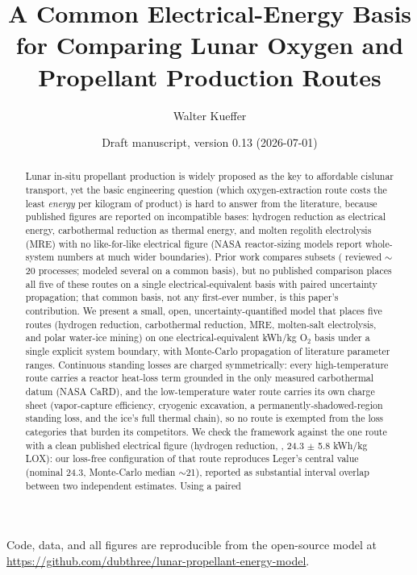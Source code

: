 \documentclass[11pt,a4paper]{article}
\title{A Common Electrical-Energy Basis for Comparing Lunar Oxygen and Propellant Production Routes}
\author{Walter Kueffer}
\date{Draft manuscript, version 0.13 (2026-07-01)}
\begin{document}
\maketitle

\begin{center}
Code, data, and all figures are reproducible from the open-source model at\\
\url{https://github.com/dubthree/lunar-propellant-energy-model}.
\end{center}

\begin{abstract}
Lunar in-situ propellant production is widely proposed as the key to affordable cislunar
transport, yet the basic engineering question (which oxygen-extraction route costs the
least \emph{energy} per kilogram of product) is hard to answer from the literature,
because published figures are reported on incompatible bases: hydrogen reduction as
electrical energy, carbothermal reduction as thermal energy, and molten regolith
electrolysis (MRE) with no like-for-like electrical figure (NASA reactor-sizing models
report whole-system numbers at much wider boundaries). Prior work compares subsets
(\citet{taylor1993} reviewed $\sim$20 processes; \citet{leger2025} modeled several on a
common basis), but no published comparison places all five of these routes on a single
electrical-equivalent basis with paired uncertainty propagation; that common basis, not
any first-ever number, is this paper's contribution. We present a small, open,
uncertainty-quantified model that places five routes (hydrogen reduction, carbothermal
reduction, MRE, molten-salt electrolysis, and polar water-ice mining) on one
electrical-equivalent kWh/kg O$_2$ basis under a single explicit system boundary, with
Monte-Carlo propagation of literature parameter ranges. Continuous standing losses are
charged symmetrically: every high-temperature route carries a reactor heat-loss term
grounded in the only measured carbothermal datum (NASA CaRD), and the low-temperature
water route carries its own charge sheet (vapor-capture efficiency, cryogenic excavation,
a permanently-shadowed-region standing loss, and the ice's full thermal chain), so no
route is exempted from the loss categories that burden its competitors. We check the
framework against the one route with a clean published electrical figure (hydrogen
reduction, \citet{leger2025}, 24.3 $\pm$ 5.8 kWh/kg LOX): our loss-free configuration of
that route reproduces Leger's central value (nominal 24.3, Monte-Carlo median $\sim$21),
reported as substantial interval overlap between two independent estimates. Using a paired

\end{abstract}
\end{document}
